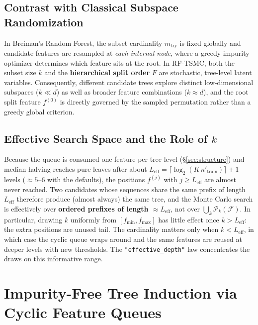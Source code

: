 \documentclass[11pt,a4paper]{article}
\newcommand{\code}[1]{\texttt{#1}}
\begin{document}
\subsection*{Contrast with Classical Subspace Randomization}

In Breiman's Random Forest, the subset cardinality $m_{\text{try}}$ is fixed globally and candidate features are resampled at \emph{each internal node}, where a greedy impurity optimizer determines which feature sits at the root. In RF-TSMC, both the subset size $k$ and the \textbf{hierarchical split order} $F$ are stochastic, tree-level latent variables. Consequently, different candidate trees explore distinct low-dimensional subspaces ($k \ll d$) as well as broader feature combinations ($k \approx d$), and the root split feature $f^{(0)}$ is directly governed by the sampled permutation rather than a greedy global criterion.

\subsection*{Effective Search Space and the Role of \texorpdfstring{$k$}{k}}

Because the queue is consumed one feature per tree level (\S\ref{sec:structure}) and median halving reaches pure leaves after about $L_{\text{eff}} = \lceil \log_2(K\, n'_{\text{train}}) \rceil + 1$ levels ($\approx 5$--$6$ with the defaults), the positions $f^{(j)}$ with $j \ge L_{\text{eff}}$ are almost never reached. Two candidates whose sequences share the same prefix of length $L_{\text{eff}}$ therefore produce (almost always) the same tree, and the Monte Carlo search is effectively over \textbf{ordered prefixes of length $\approx L_{\text{eff}}$}, not over $\bigcup_k \mathcal{P}_k(\mathcal{F})$. In particular, drawing $k$ uniformly from $[f_{\min}, f_{\max}]$ has little effect once $k > L_{\text{eff}}$: the extra positions are unused tail. The cardinality matters only when $k < L_{\text{eff}}$, in which case the cyclic queue wraps around and the same features are reused at deeper levels with new thresholds. The \code{"effective\_depth"} law concentrates the draws on this informative range.

\section{Impurity-Free Tree Induction via Cyclic Feature Queues}
\end{document}
